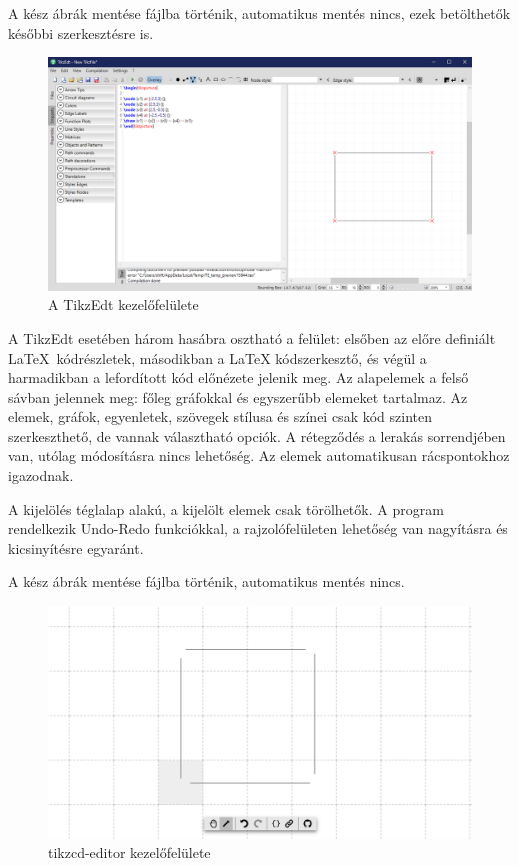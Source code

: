 A kész ábrák mentése fájlba történik, automatikus mentés nincs, ezek betölthetők későbbi szerkesztésre is. 


\begin{figure}[!h]
	\includegraphics[width=\textwidth]{images/tikzedt.png}
	\caption{A TikzEdt kezelőfelülete \cite{tikzedt}}
\label{fig:tikzedt}
\end{figure}

A TikzEdt esetében három hasábra osztható a felület: elsőben az előre definiált \LaTeX\ kódrészletek, másodikban a LaTeX kódszerkesztő, és végül a harmadikban a lefordított kód előnézete jelenik meg. Az alapelemek a felső sávban jelennek meg: főleg gráfokkal és egyszerűbb elemeket tartalmaz. Az elemek, gráfok, egyenletek, szövegek stílusa és színei csak kód szinten szerkeszthető, de vannak választható opciók. A rétegződés a lerakás sorrendjében van, utólag módosításra nincs lehetőség. Az elemek automatikusan rácspontokhoz igazodnak. 

A kijelölés téglalap alakú, a kijelölt elemek csak törölhetők. A program rendelkezik Undo-Redo funkciókkal, a rajzolófelületen lehetőség van nagyításra és kicsinyítésre egyaránt. 

A kész ábrák mentése fájlba történik, automatikus mentés nincs.


\begin{figure}[!h]
	\includegraphics[width=\textwidth]{images/tikzcd.png}
	\caption{tikzcd-editor kezelőfelülete \cite{tikzcd}}
	\label{fig:tikzcd}
\end{figure}

